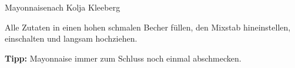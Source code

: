 \begin{recipe}{Mayonnaise}{nach Kolja Kleeberg}
  \label{Mayonnaise}
  \inglist

  \steps
  Alle Zutaten in einen hohen schmalen Becher füllen, den Mixstab hineinstellen,
  einschalten und langsam hochziehen.

  \textbf{Tipp:} Mayonnaise immer zum Schluss noch einmal abschmecken.

\end{recipe}


